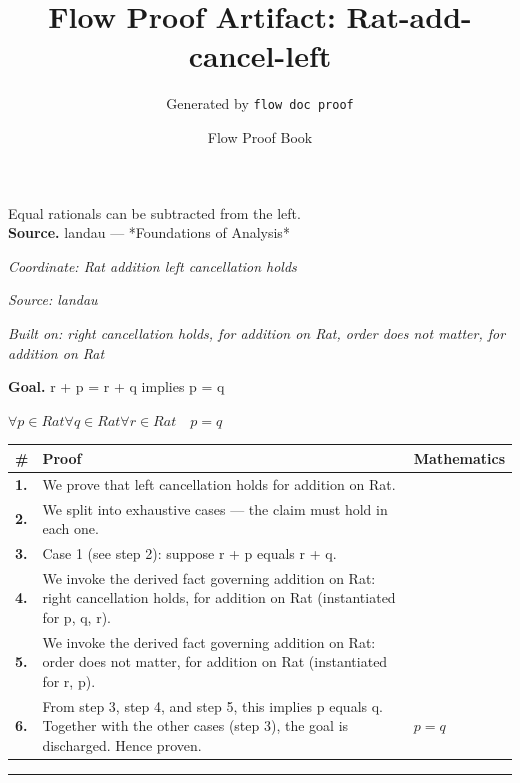 \documentclass[11pt]{article}
\title{Flow Proof Artifact: Rat-add-cancel-left}
\author{Generated by \texttt{flow doc proof}}
\date{Flow Proof Book}
\theoremstyle{definition}
\begin{document}
\maketitle
Equal rationals can be subtracted from the left.\\[0.5em]
\textbf{Source.} landau — *Foundations of Analysis*\\[0.5em]
\bigskip
{}\par
\smallskip\noindent\textit{Coordinate: Rat \cdot addition \cdot left cancellation holds}\par
\smallskip\noindent\textit{Source: landau}\par
\smallskip\noindent\textit{Built on: right cancellation holds, for addition on Rat, order does not matter, for addition on Rat}\par
\medskip
\noindent\textbf{Goal.} r + p = r + q implies p = q\par
\noindent$\displaystyle \forall p \in Rat \forall q \in Rat \forall r \in Rat\quad p = q$\par
\medskip
\noindent
\begin{tabular}{@{} >{\raggedright\arraybackslash}p{} >{\raggedright\arraybackslash}p{} >{\raggedleft\arraybackslash}p{} @{}}
\textbf{\#} & \textbf{Proof} & \textbf{Mathematics} \\
\midrule
\textbf{1.} & We prove that left cancellation holds for addition on Rat. & \\[0.45em]
\textbf{2.} & We split into exhaustive cases — the claim must hold in each one. & \\[0.45em]
\textbf{3.} & Case 1 (see step 2): suppose r + p  equals  r + q. & \\[0.45em]
\textbf{4.} & We invoke the derived fact governing addition on Rat: right cancellation holds, for addition on Rat (instantiated for p, q, r). & \\[0.45em]
\textbf{5.} & We invoke the derived fact governing addition on Rat: order does not matter, for addition on Rat (instantiated for r, p). & \\[0.45em]
\textbf{6.} & From step 3, step 4, and step 5, this implies p equals q. Together with the other cases (step 3), the goal is discharged. Hence proven. & $\displaystyle p = q$ \\[0.45em]
\bottomrule
\end{tabular}
\label{thm:Rat-addition-left_cancellation_holds}
\par\medskip\hrule
\end{document}
